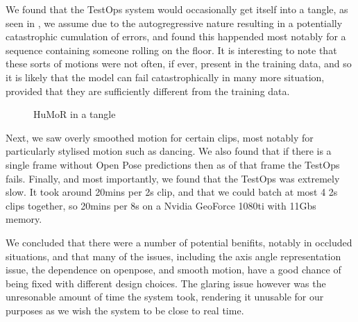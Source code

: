 We found that the TestOps system would occasionally get itself into a tangle, as seen in , we assume due to the autogregressive nature resulting in a potentially catastrophic cumulation of errors, and found this happended most notably for a sequence containing someone rolling on the floor. It is interesting to note that these sorts of motions were not often, if ever, present in the training data, and so it is likely that the model can fail catastrophically in many more situation, provided that they are sufficiently different from the training data.

\begin{figure}[!ht]
    \centering
    \hfil
    \hfil
    \caption{HuMoR in a tangle}
    \label{fig:humor_bad_mess}
\end{figure}

Next, we saw overly smoothed motion for certain clips, most notably for particularly stylised motion such as dancing.  We also found that if there is a single frame without Open Pose predictions then as of that frame the TestOps fails. Finally, and most importantly, we found that the TestOps was extremely slow. It took around 20mins per 2s clip, and that we could batch at most 4 2s clips together, so 20mins per 8s on a Nvidia GeoForce 1080ti with 11Gbs memory.

We concluded that there were a number of potential benifits, notably in occluded situations, and that many of the issues, including the axis angle representation issue, the dependence on openpose, and smooth motion, have a good chance of being fixed with different design choices.  The glaring issue however was the unresonable amount of time the system took, rendering it unusable for our purposes as we wish the system to be close to real time.

